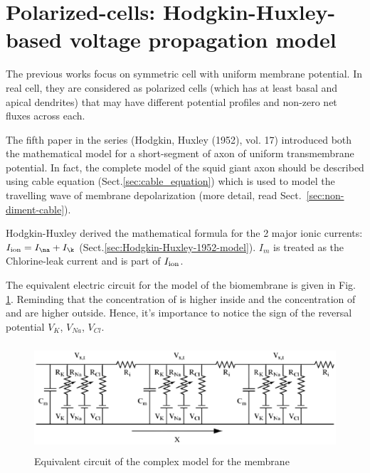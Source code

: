 \section{Polarized-cells: Hodgkin-Huxley-based voltage propagation model}
\label{sec:Hodgkin-Huxley-1952-model-of-propagation}
\label{sec:polarized-cell}


The previous works focus on symmetric cell with uniform membrane potential.
In real cell, they are considered as polarized cells (which has at least basal
and apical dendrites) that may have different potential profiles and non-zero
net fluxes across each. 

The fifth paper in the series (Hodgkin, Huxley (1952), vol. 17) introduced both
the mathematical model for a short-segment of axon of uniform transmembrane
potential. In fact, the complete model of the squid giant axon should be
described using cable equation (Sect.\ref{sec:cable_equation}) which is used to
model the travelling wave of membrane depolarization (more detail, read
Sect.~\ref{sec:non-diment-cable}).

Hodgkin-Huxley derived the mathematical formula for the 2 major ionic currents:
$I_\ion = I_\na + I_\k$ (Sect.\ref{sec:Hodgkin-Huxley-1952-model}). $I_m$ is treated
as the Chlorine-leak current and is part of $I_{\text{ion}}$.


The equivalent electric circuit for the model of the biomembrane is
given in Fig. \ref{fig:membrane_ionic}. Reminding that the
concentration of  is higher inside and the concentration of
 and  are higher outside. Hence, it's importance to
notice the sign of the reversal potential $V_{K}$, $V_{Na}$,
$V_{Cl}$.

\begin{figure}[htb]
\centerline{\includegraphics[height=4cm]{./images/membrane_ionic_current.eps}}
\caption{Equivalent circuit of the complex model for the
  membrane}\label{fig:membrane_ionic}
\end{figure} 


